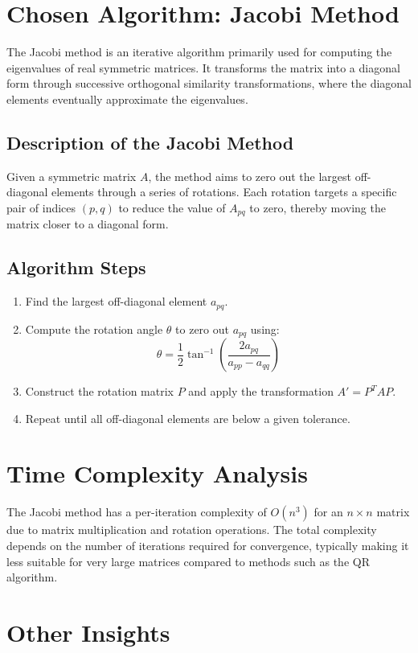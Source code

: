 \documentclass[12pt]{article}
\begin{document}
\section{Chosen Algorithm: Jacobi Method}
The Jacobi method is an iterative algorithm primarily used for computing the eigenvalues of real symmetric matrices. It transforms the matrix into a diagonal form through successive orthogonal similarity transformations, where the diagonal elements eventually approximate the eigenvalues.

\subsection{Description of the Jacobi Method}
Given a symmetric matrix $A$, the method aims to zero out the largest off-diagonal elements through a series of rotations. Each rotation targets a specific pair of indices $(p, q)$ to reduce the value of $A_{pq}$ to zero, thereby moving the matrix closer to a diagonal form.

\subsection{Algorithm Steps}
\begin{enumerate}
    \item Find the largest off-diagonal element $a_{pq}$.
    \item Compute the rotation angle $\theta$ to zero out $a_{pq}$ using:
    \[
    \theta = \frac{1}{2} \tan^{-1} \left( \frac{2a_{pq}}{a_{pp} - a_{qq}} \right)
    \]
    \item Construct the rotation matrix $P$ and apply the transformation $A' = P^T A P$.
    \item Repeat until all off-diagonal elements are below a given tolerance.
\end{enumerate}

\section{Time Complexity Analysis}
The Jacobi method has a per-iteration complexity of $O(n^3)$ for an $n \times n$ matrix due to matrix multiplication and rotation operations. The total complexity depends on the number of iterations required for convergence, typically making it less suitable for very large matrices compared to methods such as the QR algorithm.

\section{Other Insights}
\end{document}

